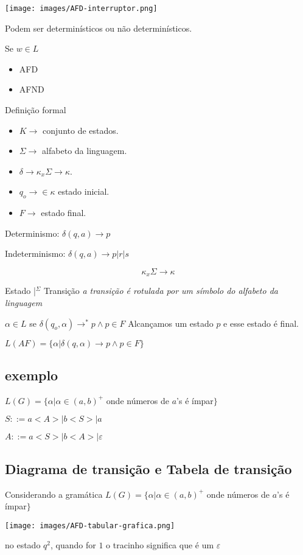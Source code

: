 \documentclass[]{article}
\begin{document}
		\texttt{[image: images/AFD-interruptor.png]}		
		
		Podem ser determinísticos ou não determinísticos.
		
		Se $w \in L$
		\begin{itemize}
			\item AFD
			\item AFND
		\end{itemize}
		
		Definição formal		
		\begin{itemize}
			\item $K \to$ conjunto de estados.
			\item $\Sigma \to$ alfabeto da linguagem.
			\item $\delta \to \kappa _x \Sigma \to \kappa$.
			\item $q_o \to \in \kappa$ estado inicial.
			\item $F \to $ estado final.
		\end{itemize}
		
		Determinismo: $\delta(q,a) \to p$
		
		Indeterminismo: $\delta(q,a) \to p | r | s$
		
		$$\kappa _x \Sigma \to \kappa$$
		
		Estado |$^\Sigma$ Transição \textit{a transição é rotulada por um símbolo do alfabeto da linguagem}
		
		$\alpha \in L$ se $\delta (q_o, \alpha) \to^* p \wedge p \in F$ Alcançamos um estado $p$ e esse estado é final.
		
		$L(AF) = \{ \alpha | \delta(q,\alpha) \to p \wedge p \in F\}$
		\subsection{exemplo}		
		$L(G) =\{ \alpha | \alpha \in (a,b)^+$ onde números de $a$'s é ímpar$\}$
		
		$S::= a<A> | b<S> | a$ %
		
		$A::= a<S> | b<A> |\varepsilon$
		
		\subsection{Diagrama de transição e Tabela de transição}
		Considerando a gramática $L(G) =\{ \alpha | \alpha \in (a,b)^+$ onde números de $a$'s é ímpar$\}$
		

		\texttt{[image: images/AFD-tabular-grafica.png]}
		
		no estado $q^2$, quando for $1$ o tracinho significa que é um $\varepsilon$
\end{document}
